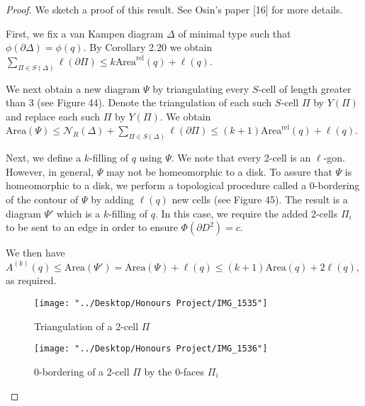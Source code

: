 \documentclass[12pt]{article}
\newcommand{\vs}{\vskip10pt}
\begin{document}
	\begin{proof}
		
		We sketch a proof of this result. See Osin's paper [16] for more details.
		
		\vs 
		
		First, we fix a van Kampen diagram $\Delta$ of minimal type such that $\phi(\partial \Delta) = \phi(q)$. By Corollary 2.20 we obtain $\sum_{\Pi \in S(\Delta)} \ell(\partial \Pi) \leq k \text{Area}^{\text{rel}}(q) + \ell(q)$. 
		
		\vs 
		
		We next obtain a new diagram $\Psi$ by triangulating every $S$-cell of length greater than 3 (see Figure 44). Denote the triangulation of each such $S$-cell $\Pi$ by $Y(\Pi)$ and replace each such $\Pi$ by $Y(\Pi)$. We obtain $\text{Area} (\Psi) \leq \mathcal{N}_R (\Delta) +\sum_{\Pi \in S(\Delta)} \ell(\partial \Pi) \leq (k+1) \text{Area}^{\text{rel}}(q) + \ell(q)$. 
		
		\vs 
		
		Next, we define a $k$-filling of $q$ using $\Psi$. We note that every 2-cell is an $\ell$-gon. However, in general, $\Psi$ may not be homeomorphic to a disk. To assure that $\Psi$ is homeomorphic to a disk, we perform a topological procedure called a 0-bordering of the contour of $\Psi$ by adding $\ell(q)$ new cells (see Figure 45). The result is a diagram $\Psi'$ which is a $k$-filling of $q$. In this case, we require the added 2-cells $\Pi_i$ to be sent to an edge in order to ensure $\Phi(\partial D^2) = c$. 
		
		\vs 
		
		We then have $A^{(k)}(q) \leq \text{Area}(\Psi') = \text{Area}(\Psi) + \ell(q) \leq (k+1) \text{Area}(q) + 2 \ell(q)$, as required. 
		
		\vs
		
\begin{figure} [H]
	\centering
	\texttt{[image: "../Desktop/Honours Project/IMG\_1535"]}
	\caption{Triangulation of a 2-cell $\Pi$}
	\label{fig:img1535}
\end{figure}

\begin{figure} [H]
	\centering
	\texttt{[image: "../Desktop/Honours Project/IMG\_1536"]}
	\caption{0-bordering of a 2-cell $\Pi$ by the 0-faces $\Pi_i$}
	\label{fig:img1536}
\end{figure}


	\end{proof}
\end{document}
